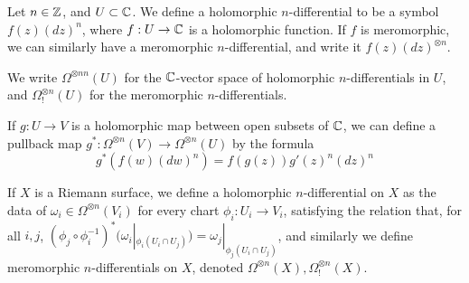 \documentclass[10pt,a4paper]{article}
\begin{document}
\begin{definition}
  Let $n \in \mathbb{Z}$, and $U \subset \mathbb{C}$. We define a holomorphic $n$-differential to be a symbol $f(z)(dz)^n$, where $f:U \to \mathbb{C}$ is a holomorphic function. If $f$ is meromorphic, we can similarly have a meromorphic $n$-differential, and write it $f(z)(dz)^{\otimes n}$.

  We write $\Omega^{\otimes nn}(U)$ for the $\mathbb{C}$-vector space of holomorphic $n$-differentials in $U$, and $\Omega^{\otimes n}_!(U)$ for the meromorphic $n$-differentials.

  If $g:U \to V$ is a holomorphic map between open subsets of $\mathbb{C}$, we can define a pullback map $g^\ast : \Omega^{\otimes n}(V)\to \Omega^{\otimes n}(U)$ by the formula
  \[g^\ast(f(w)(dw)^n) = f(g(z))g'(z)^n (dz)^n\]
\end{definition}
If $X$ is a Riemann surface, we define a holomorphic $n$-differential on $X$ as the data of $\omega_i \in \Omega^{\otimes n}(V_i)$ for every chart $\phi_i:U_i \to V_i$, satisfying the relation that, for all $i,j$, $(\phi_j \circ \phi_i^{-1})^\ast(\omega_i|_{\phi_i(U_i \cap U_j)}) = \omega_j|_{\phi_j(U_i \cap U_j)}$, and similarly we define meromorphic $n$-differentials on $X$, denoted $\Omega^{\otimes n}(X), \Omega^{\otimes n}_!(X)$.
\end{document}
